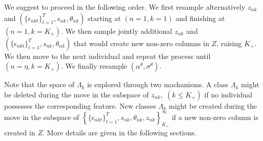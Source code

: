 \documentclass[12pt]{article}
\begin{document}
We suggest to proceed in the following order. We first resample alternatively $z_{nk}$ and $\left( \{\epsilon_{nkt}\}_{t=1}^T, s_{nk}, \theta_{nk} \right)$ starting at $(n=1,k=1)$ and finishing at $(n=1,k=K_+)$. We then sample jointly additional $z_{nk}$ and $\left(\{\epsilon_{nkt}\}_{t=1}^T, s_{nk}, \theta_{nk}\right)$ that would create new non-zero columns in $Z$, raising $K_+$. We then move to the next individual and repeat the process until $(n=\eta,k=K_+)$. We finally resample $\left( \alpha^\theta, \sigma^\theta \right) $.

Note that the space of $\Lambda_{k}$ is explored through two machanisms. A class $\Lambda_{k}$ might be deleted during the move in the subspace of $z_{nk}, \;(k \leq K_+)$ if no individual possesses the corresponding feature. New classes $\Lambda_{k}$ might be created during the move in the subspace of $\left\{ \{\epsilon_{nkt}\}_{t=1}^T, s_{nk}, \theta_{nk},z_{nk} \right\}_{K_+}^{\infty}$ if a new non-zero column is created in $Z$. More details are given in the following sections.  
\end{document}
